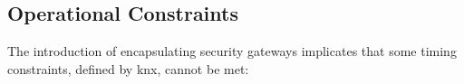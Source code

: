 

\subsection{Operational Constraints}\label{sec:opContraints}

The introduction of encapsulating security gateways implicates that some timing constraints, defined by \gls{knx}, cannot be met:

